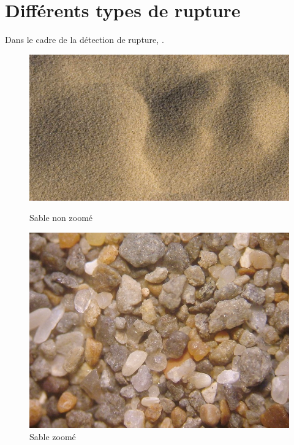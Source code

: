 \section{Différents types de rupture}

Dans le cadre de la détection de rupture, .


\begin{figure}
   \begin{minipage}[c]{.46\linewidth}
	  \centering
      \includegraphics[scale=0.16]{img/sableNoZoom.jpg}
      \caption{\label{noZoom} Sable non zoomé}
   \end{minipage} \hfill
   \begin{minipage}[c]{.46\linewidth}
      \centering
      \includegraphics[scale=0.2]{img/sableZoom.jpg}
      \caption{\label{Zoom} Sable zoomé}
   \end{minipage}
\end{figure}

